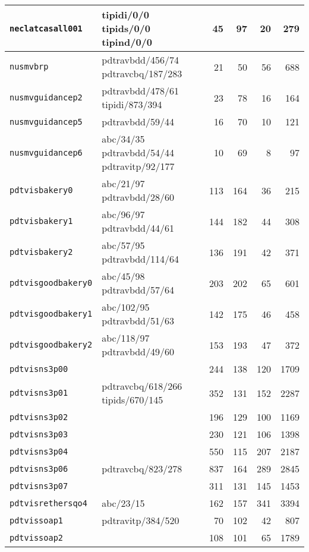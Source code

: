 \documentclass{llncs}
\begin{document}
\begin{table}[tb]
{\begin{tabular}{|l|l|r|r|r|r|}
{\tt neclatcasall001} & {\sf tipidi}/0/0 {\sf tipids}/0/0 {\sf tipind}/0/0 & 45 & 97 & 20 & 279 \\ \hline
{\tt nusmvbrp} & {\sf pdtravbdd}/456/74 {\sf pdtravcbq}/187/283 & 21 & 50 & 56 & 688 \\ \hline
{\tt nusmvguidancep2} & {\sf pdtravbdd}/478/61 {\sf tipidi}/873/394 & 23 & 78 & 16 & 164 \\ \hline
{\tt nusmvguidancep5} & {\sf pdtravbdd}/59/44 & 16 & 70 & 10 & 121 \\ \hline
{\tt nusmvguidancep6} & {\sf abc}/34/35 {\sf pdtravbdd}/54/44 {\sf pdtravitp}/92/177 & 10 & 69 & 8 & 97 \\ \hline
{\tt pdtvisbakery0} & {\sf abc}/21/97 {\sf pdtravbdd}/28/60 & 113 & 164 & 36 & 215 \\ \hline
{\tt pdtvisbakery1} & {\sf abc}/96/97 {\sf pdtravbdd}/44/61 & 144 & 182 & 44 & 308 \\ \hline
{\tt pdtvisbakery2} & {\sf abc}/57/95 {\sf pdtravbdd}/114/64 & 136 & 191 & 42 & 371 \\ \hline
{\tt pdtvisgoodbakery0} & {\sf abc}/45/98 {\sf pdtravbdd}/57/64 & 203 & 202 & 65 & 601 \\ \hline
{\tt pdtvisgoodbakery1} & {\sf abc}/102/95 {\sf pdtravbdd}/51/63 & 142 & 175 & 46 & 458 \\ \hline
{\tt pdtvisgoodbakery2} & {\sf abc}/118/97 {\sf pdtravbdd}/49/60 & 153 & 193 & 47 & 372 \\ \hline
{\tt pdtvisns3p00} & & 244 & 138 & 120 & 1709 \\ \hline
{\tt pdtvisns3p01} & {\sf pdtravcbq}/618/266 {\sf tipids}/670/145 & 352 & 131 & 152 & 2287 \\ \hline
{\tt pdtvisns3p02} & & 196 & 129 & 100 & 1169 \\ \hline
{\tt pdtvisns3p03} & & 230 & 121 & 106 & 1398 \\ \hline
{\tt pdtvisns3p04} & & 550 & 115 & 207 & 2187 \\ \hline
{\tt pdtvisns3p06} & {\sf pdtravcbq}/823/278 & 837 & 164 & 289 & 2845 \\ \hline
{\tt pdtvisns3p07} & & 311 & 131 & 145 & 1453 \\ \hline
{\tt pdtvisrethersqo4} & {\sf abc}/23/15 & 162 & 157 & 341 & 3394 \\ \hline
{\tt pdtvissoap1} & {\sf pdtravitp}/384/520 & 70 & 102 & 42 & 807 \\ \hline
{\tt pdtvissoap2} & & 108 & 101 & 65 & 1789 \\ \hline
 \end{tabular}
\vspace{1em}
}
\end{table}
\end{document}
